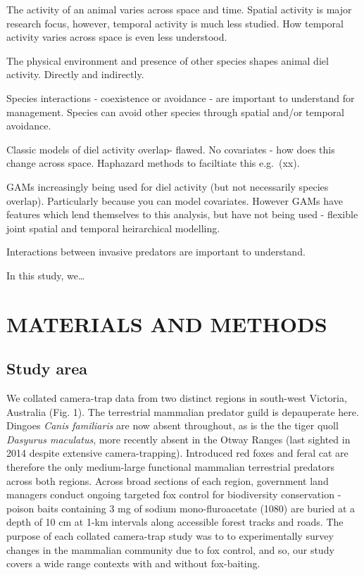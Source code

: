 \documentclass[]{elsarticle} %
\begin{document}
The activity of an animal varies across space and time.
Spatial activity is major research focus, however, temporal activity is much less studied.
How temporal activity varies across space is even less understood.

The physical environment and presence of other species shapes animal diel activity.
Directly and indirectly.

Species interactions - coexistence or avoidance - are important to understand for management.
Species can avoid other species through spatial and/or temporal avoidance.

Classic models of diel activity overlap- flawed.
No covariates - how does this change across space.
Haphazard methods to faciltiate this e.g.~(xx).

GAMs increasingly being used for diel activity (but not necessarily species overlap).
Particularly because you can model covariates.
However GAMs have features which lend themselves to this analysis, but have not being used - flexible joint spatial and temporal heirarchical modelling.

Interactions between invasive predators are important to understand.

In this study, we\ldots{}

\newpage

\hypertarget{materials-and-methods}{%
\section{MATERIALS AND METHODS}\label{materials-and-methods}}

\hypertarget{study-area}{%
\subsection{Study area}\label{study-area}}

We collated camera-trap data from two distinct regions in south-west Victoria, Australia (Fig. 1). The terrestrial mammalian predator guild is depauperate here. Dingoes \emph{Canis familiaris} are now absent throughout, as is the the tiger quoll \emph{Dasyurus maculatus}, more recently absent in the Otway Ranges (last sighted in 2014 despite extensive camera-trapping). Introduced red foxes and feral cat are therefore the only medium-large functional mammalian terrestrial predators across both regions. Across broad sections of each region, government land managers conduct ongoing targeted fox control for biodiversity conservation - poison baits containing 3 mg of sodium mono-fluroacetate (1080) are buried at a depth of 10 cm at 1-km intervals along accessible forest tracks and roads. The purpose of each collated camera-trap study was to to experimentally survey changes in the mammalian community due to fox control, and so, our study covers a wide range contexts with and without fox-baiting.
\end{document}
